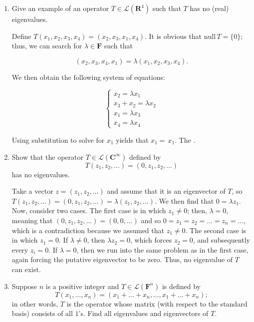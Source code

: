 \documentclass{book}
\begin{document}
\begin{enumerate}
\item Give an example of an operator \(T \in \mathcal{L}(\textbf{R}^4)\) such that \(T\) has no (real) eigenvalues.

Define \(T(x_1,x_2,x_3,x_4)=(x_2,x_3,x_1,x_4)\).  It is obvious that \(\text{null} \, T = \{0\}\); thus, we can search for \(\lambda \in \textbf{F}\) such that
    
\begin{equation*}
    (x_2,x_3,x_4,x_1) = \lambda(x_1,x_2,x_3,x_4).
\end{equation*}

We then obtain the following system of equations:

\begin{equation*}
    \begin{cases}
        x_2 = \lambda x_1 \\
        x_3 + x_2 = \lambda x_2 \\
        x_1 = \lambda x_3 \\
        x_4 = \lambda x_4
    \end{cases}
\end{equation*}

Using substitution to solve for \(x_1\) yields that \(x_1 = \frac{}{}x_1\).  The .

\item Show that the operator \(T \in \mathcal{L}(\textbf{C}^{\infty})\) defined by \[T(z_1,z_2,\dots)=(0,z_1,z_2,\dots)\] has no eigenvalues.

Take a vector \(z=(z_1,z_2,\dots)\) and assume that it is an eigenvector of \(T\), so \(T(z_1,z_2,\dots)=(0,z_1,z_2,\dots)=\lambda(z_1,z_2,\dots)\).  We then find that \(0=\lambda{z_1}\).  Now, consider two cases.  The first case is in which \(z_1 \neq 0\); then, \(\lambda=0\), meaning that \((0,z_1,z_2,\dots)=(0,0,\dots)\) and so \(0=z_1=z_2=\dots=z_n=\dots\), which is a contradiction because we assumed that \(z_1 \neq 0\).  The second case is in which \(z_1=0\).  If \(\lambda \neq 0\), then \(\lambda{z_2} = 0\), which forces \(z_2=0\), and subsequently every \(z_i=0\).  If \(\lambda = 0\), then we run into the same problem as in the first case, again forcing the putative eigenvector to be zero.  Thus, no eigenvalue of \(T\) can exist.

\item Suppose \(n\) is a positive integer and \(T \in \mathcal{L}(\textbf{F}^n)\) is defined by \[T(x_1,\dots,x_n)=(x_1+\dots+x_n,\dots,x_1+\dots+x_n);\] in other words, \(T\) is the operator whose matrix (with respect to the standard basis) consists of all \(1\)'s.  Find all eigenvalues and eigenvectors of \(T\).


\end{enumerate}
\end{document}
